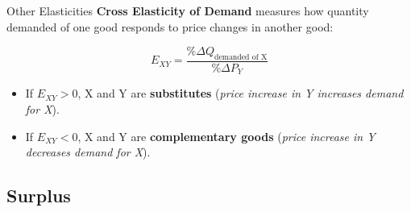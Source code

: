 \documentclass[10pt]{article}
\begin{document}
\begin{core}{Other Elasticities}
      \textbf{Cross Elasticity of Demand} measures how quantity demanded of one good responds to price changes in another good:

      \[
        E_{XY} = \frac{\%\Delta Q_{\text{demanded of X}}}{\%\Delta P_Y}
      \]

      \begin{itemize}

        \item If $E_{XY} > 0$, X and Y are \textbf{substitutes} (\textit{price increase in Y increases demand for X}).

        \item If $E_{XY} < 0$, X and Y are \textbf{complementary goods} (\textit{price increase in Y decreases demand for X}).

      \end{itemize}


    \end{core}

  \subsection{Surplus}
    
\end{document}
